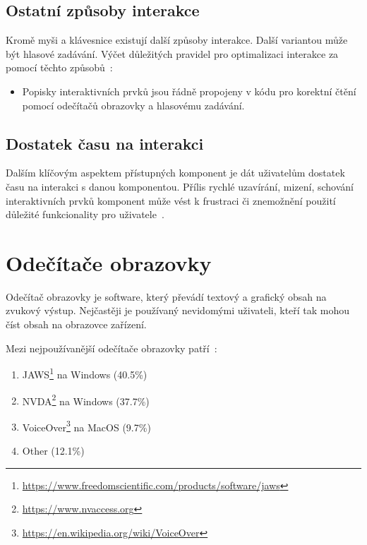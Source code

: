 \subsection{Ostatní způsoby interakce}


Kromě myši a klávesnice existují další způsoby interakce.
Další variantou může být hlasové zadávání.
Výčet důležitých pravidel pro optimalizaci interakce za pomocí těchto způsobů~\cite{w3-accessibility-principles}:


\begin{itemize}
  \item Popisky interaktivních prvků jsou řádně propojeny v kódu pro korektní čtění pomocí odečítačů obrazovky a hlasovému zadávání.
\end{itemize}

\subsection{Dostatek času na interakci}

Dalším klíčovým aspektem přístupných komponent je dát uživatelům dostatek času na interakci s danou komponentou.
Přílis rychlé uzavírání, mizení, schování interaktivních prvků komponent může vést k frustraci či znemožnění použití důležité funkcionality pro uživatele~\cite{w3-accessibility-principles}.

\section{Odečítače obrazovky}

Odečítač obrazovky je software, který převádí textový a grafický obsah na zvukový výstup.
Nejčastěji je používaný nevidomými uživateli, kteří tak mohou číst obsah na obrazovce zařízení.

Mezi nejpoužívanější odečítače obrazovky patří~\cite{webaim-survey-2024}:

\begin{enumerate}
  \item JAWS\footnote{\url{https://www.freedomscientific.com/products/software/jaws}} na Windows (40.5\%)
  \item NVDA\footnote{\url{https://www.nvaccess.org}} na Windows (37.7\%)
  \item VoiceOver\footnote{\url{https://en.wikipedia.org/wiki/VoiceOver}} na MacOS (9.7\%)
  \item Other (12.1\%)
\end{enumerate}

